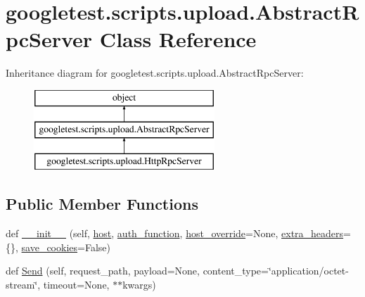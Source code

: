 \hypertarget{classgoogletest_1_1scripts_1_1upload_1_1_abstract_rpc_server}{}\section{googletest.\+scripts.\+upload.\+Abstract\+Rpc\+Server Class Reference}
\label{classgoogletest_1_1scripts_1_1upload_1_1_abstract_rpc_server}
Inheritance diagram for googletest.\+scripts.\+upload.\+Abstract\+Rpc\+Server\+:\begin{figure}[H]
\begin{center}
\leavevmode
\includegraphics[height=3.000000cm]{d4/db8/classgoogletest_1_1scripts_1_1upload_1_1_abstract_rpc_server}
\end{center}
\end{figure}
\subsection*{Public Member Functions}
\begin{DoxyCompactItemize}
\item 
def \mbox{\hyperlink{classgoogletest_1_1scripts_1_1upload_1_1_abstract_rpc_server_aeb78ded9d1edafbf85b99bf6cf4309e0}{\+\_\+\+\_\+init\+\_\+\+\_\+}} (self, \mbox{\hyperlink{classgoogletest_1_1scripts_1_1upload_1_1_abstract_rpc_server_aa1334335424a5382caed65ee63375007}{host}}, \mbox{\hyperlink{classgoogletest_1_1scripts_1_1upload_1_1_abstract_rpc_server_ac6af7f7d28ac4e5770ab85a27a2e6452}{auth\+\_\+function}}, \mbox{\hyperlink{classgoogletest_1_1scripts_1_1upload_1_1_abstract_rpc_server_a8b509378400626f486134138fdbe8cb3}{host\+\_\+override}}=None, \mbox{\hyperlink{classgoogletest_1_1scripts_1_1upload_1_1_abstract_rpc_server_abd6fdce28ccdb05805f0728b8dce278a}{extra\+\_\+headers}}=\{\}, \mbox{\hyperlink{classgoogletest_1_1scripts_1_1upload_1_1_abstract_rpc_server_a741a8413da49641e293de90860212ef5}{save\+\_\+cookies}}=False)
\item 
def \mbox{\hyperlink{classgoogletest_1_1scripts_1_1upload_1_1_abstract_rpc_server_a2d5933bff99163c58b94074e819af422}{Send}} (self, request\+\_\+path, payload=None, content\+\_\+type=\char`\"{}application/octet-\/stream\char`\"{}, timeout=None, $\ast$$\ast$kwargs)
\end{DoxyCompactItemize}
